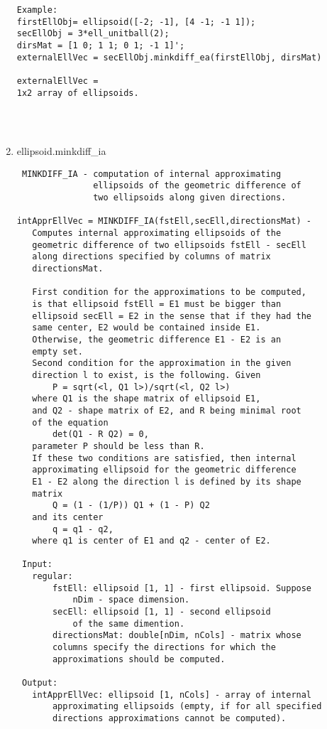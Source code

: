 \begin{enumerate}
\begin{lstlisting}
Example:
firstEllObj= ellipsoid([-2; -1], [4 -1; -1 1]);
secEllObj = 3*ell_unitball(2);
dirsMat = [1 0; 1 1; 0 1; -1 1]';
externalEllVec = secEllObj.minkdiff_ea(firstEllObj, dirsMat)

externalEllVec =
1x2 array of ellipsoids.




\end{lstlisting}
\fontfamily{\familydefault}
\selectfont
\item {ellipsoid.minkdiff\_ia}
\selectfont
\begin{lstlisting}
 MINKDIFF_IA - computation of internal approximating
               ellipsoids of the geometric difference of
               two ellipsoids along given directions.

intApprEllVec = MINKDIFF_IA(fstEll,secEll,directionsMat) -
   Computes internal approximating ellipsoids of the
   geometric difference of two ellipsoids fstEll - secEll
   along directions specified by columns of matrix
   directionsMat.

   First condition for the approximations to be computed,
   is that ellipsoid fstEll = E1 must be bigger than
   ellipsoid secEll = E2 in the sense that if they had the
   same center, E2 would be contained inside E1.
   Otherwise, the geometric difference E1 - E2 is an
   empty set.
   Second condition for the approximation in the given
   direction l to exist, is the following. Given
       P = sqrt(<l, Q1 l>)/sqrt(<l, Q2 l>)
   where Q1 is the shape matrix of ellipsoid E1,
   and Q2 - shape matrix of E2, and R being minimal root
   of the equation
       det(Q1 - R Q2) = 0,
   parameter P should be less than R.
   If these two conditions are satisfied, then internal
   approximating ellipsoid for the geometric difference
   E1 - E2 along the direction l is defined by its shape
   matrix
       Q = (1 - (1/P)) Q1 + (1 - P) Q2
   and its center
       q = q1 - q2,
   where q1 is center of E1 and q2 - center of E2.

 Input:
   regular:
       fstEll: ellipsoid [1, 1] - first ellipsoid. Suppose
           nDim - space dimension.
       secEll: ellipsoid [1, 1] - second ellipsoid
           of the same dimention.
       directionsMat: double[nDim, nCols] - matrix whose
       columns specify the directions for which the
       approximations should be computed.

 Output:
   intApprEllVec: ellipsoid [1, nCols] - array of internal
       approximating ellipsoids (empty, if for all specified
       directions approximations cannot be computed).


\end{lstlisting}
\end{enumerate}
